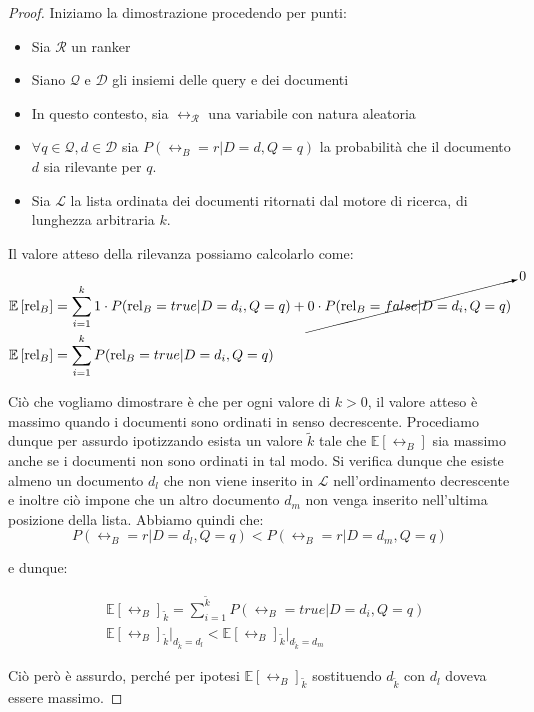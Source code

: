 \begin{proof}
	Iniziamo la dimostrazione procedendo per punti:
	\begin{itemize}
		\item Sia $\mathcal{R}$ un ranker
		\item Siano $\mathcal{Q}$ e $\mathcal{D}$ gli insiemi delle query e dei documenti
		\item In questo contesto, sia $\rel_\mathcal{R}$ una variabile con natura aleatoria
		\item $\forall{q \in \mathcal{Q}, d \in \mathcal{D}}$ sia $P(\rel_B = r  | D = d, Q = q )$
		la probabilità che il documento $d$ sia rilevante per $q$.
		\item Sia $\mathcal{L}$  la lista ordinata dei documenti ritornati dal motore di ricerca, di lunghezza arbitraria
		$k$.
	\end{itemize}

Il valore atteso della rilevanza possiamo calcolarlo come:
\begin{align*}
& \mathbb{E}\left[\text{rel}_B\right] = \sum_{i=1}^{k}{
	1 \cdot P(\text{rel}_B = true  | D = d_i, Q = q ) + \cancelto{0}{0 \cdot  P(\text{rel}_B = false  | D = d_i, Q = q )}
} \\
& \mathbb{E}\left[\text{rel}_B\right] = \sum_{i=1}^{k}{P(\text{rel}_B = true  | D = d_i, Q = q )}
\end{align*}

Ciò che vogliamo dimostrare è che per ogni valore di $k>0$, il valore atteso è massimo quando i documenti
sono ordinati in senso decrescente.
Procediamo dunque per assurdo ipotizzando esista un valore $\tilde{k}$ tale che $\mathbb{E}[\rel_B]$ sia
massimo anche se i documenti non sono ordinati in tal modo.
Si verifica dunque che esiste almeno un documento $d_l$ che non viene inserito in $\mathcal{L}$ nell'ordinamento
decrescente e inoltre ciò impone che un altro documento $d_m$ non venga inserito nell'ultima posizione della lista.
Abbiamo quindi che:
$$
P(\rel_B = r | D = d_l, Q=q)  < P(\rel_B = r| D = d_m, Q = q)
$$

e dunque:

\begin{align*}
& \mathbb{E}\left[\rel_B\right]_{\tilde{k}} = \sum_{i=1}^{\tilde{k}}{P(\rel_B = true | D = d_i, Q = q)} \\
	& \mathbb{E}[\rel_B]_{\tilde{k}} \Big|_{d_{\tilde{k}} = d_{l}} < \mathbb{E}[\rel_B]_{\tilde{k}} \Big|_{d_{\tilde{k}} = d_{m}}
\end{align*}

Ciò però è assurdo, perché per ipotesi $\mathbb{E}\left[\rel_B\right]_{\tilde{k}}$ sostituendo $d_{\tilde{k}}$ con $d_l$ doveva
essere massimo.
\end{proof}

